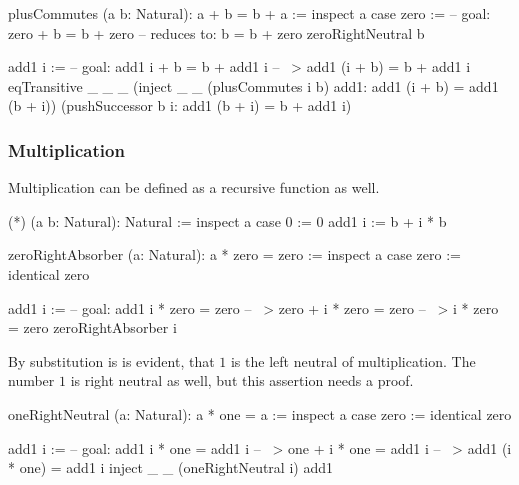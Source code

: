 \begin{alba}
    plusCommutes (a b: Natural): a + b = b + a :=
        inspect a case
            zero :=
                -- goal: zero + b = b + zero
                -- reduces to: b = b + zero
                zeroRightNeutral b

            add1 i :=
                -- goal: add1 i + b = b + add1 i
                -- ~>    add1 (i + b) = b + add1 i
                eqTransitive
                    _ _ _
                    (inject _ _ (plusCommutes i b) add1:
                        add1 (i + b) = add1 (b + i))
                    (pushSuccessor b i:
                        add1 (b + i) =  b + add1 i)
\end{alba}







\subsubsection{Multiplication}



Multiplication can be defined as a recursive function as well.

\begin{alba}
  (*) (a b: Natural): Natural :=
    inspect a case
        0 :=
            0
        add1 i :=
            b + i * b
\end{alba}

\begin{alba}
    zeroRightAbsorber (a: Natural): a * zero = zero :=
        inspect a case
            zero :=
                identical zero

            add1 i :=
                -- goal: add1 i * zero = zero
                -- ~>    zero + i * zero = zero
                -- ~>    i * zero = zero
                zeroRightAbsorber i
\end{alba}

By substitution is is evident, that $1$ is the left neutral of
multiplication. The number $1$ is right neutral as well, but this assertion
needs a proof.

\begin{alba}
    oneRightNeutral (a: Natural): a * one = a :=
        inspect a case
            zero :=
                identical zero

            add1 i :=
                -- goal:  add1 i * one = add1 i
                -- ~>     one + i * one = add1 i
                -- ~>     add1 (i * one) = add1 i
                inject _ _
                    (oneRightNeutral i)
                    add1
\end{alba}


